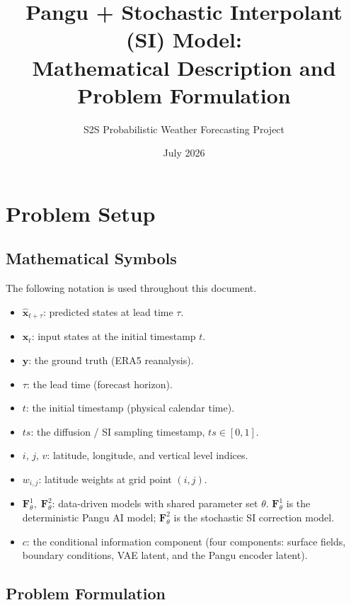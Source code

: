 \documentclass[11pt]{article}
\title{Pangu + Stochastic Interpolant (SI) Model:\\
       Mathematical Description and Problem Formulation}
\author{S2S Probabilistic Weather Forecasting Project}
\date{July 2026}
\begin{document}
\maketitle
\tableofcontents
\newpage

\section{Problem Setup}

\subsection{Mathematical Symbols}

The following notation is used throughout this document.

\begin{itemize}
  \item $\hat{\mathbf{x}}_{t+\tau}$\;: predicted states at lead time $\tau$.
  \item $\mathbf{x}_t$\;: input states at the initial timestamp $t$.
  \item $\mathbf{y}$\;: the ground truth (ERA5 reanalysis).
  \item $\tau$\;: the lead time (forecast horizon).
  \item $t$\;: the initial timestamp (physical calendar time).
  \item $ts$\;: the diffusion / SI sampling timestamp, $ts \in [0,1]$.
  \item $i,\,j,\,v$\;: latitude, longitude, and vertical level indices.
  \item $w_{i,j}$\;: latitude weights at grid point $(i,j)$.
  \item $\mathbf{F}^1_\theta,\;\mathbf{F}^2_\theta$\;: data-driven models with
        shared parameter set $\theta$.
        $\mathbf{F}^1_\theta$ is the deterministic Pangu AI model;
        $\mathbf{F}^2_\theta$ is the stochastic SI correction model.
  \item $c$\;: the conditional information component (four components: surface
        fields, boundary conditions, VAE latent, and the Pangu encoder latent).
\end{itemize}

\subsection{Problem Formulation}
\end{document}
